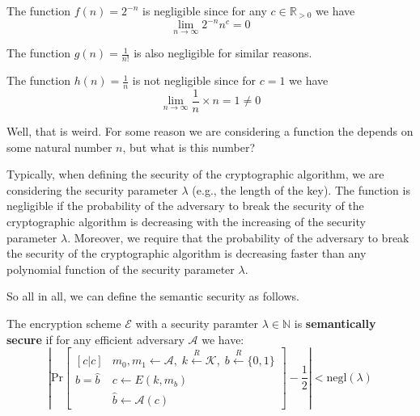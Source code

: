 \documentclass[../lecture-notes.tex]{subfiles}
\begin{document}
\begin{example}
    The function $f(n) = 2^{-n}$ is negligible since for any $c \in \mathbb{R}_{>0}$ we have
    \begin{equation}
        \lim_{n \to \infty} 2^{-n}n^c = 0
    \end{equation}

    The function $g(n) = \frac{1}{n!}$ is also negligible for similar reasons.
\end{example}

\begin{example}
    The function $h(n) = \frac{1}{n}$ is not negligible since for $c = 1$ we have
    \begin{equation}
        \lim_{n \to \infty} \frac{1}{n} \times n = 1 \neq 0
    \end{equation}
\end{example}

Well, that is weird. For some reason we are considering a function the depends on some natural number $n$, but what is this number?

Typically, when defining the security of the cryptographic algorithm, we are considering the security parameter $\lambda$ (e.g., the length of the key). The function is negligible if the probability of the adversary to break the security of the cryptographic algorithm is decreasing with the increasing of the security parameter $\lambda$. Moreover, we require that the probability of the adversary to break the security of the cryptographic algorithm is decreasing faster than any polynomial function of the security parameter $\lambda$.

So all in all, we can define the semantic security as follows.

\begin{definition}
    The encryption scheme $\mathcal{E}$ with a security paramter $\lambda \in \mathbb{N}$ is \textbf{semantically secure} if for any efficient adversary $\mathcal{A}$ we have:
    \begin{equation}
        \left|\text{Pr}\begin{bmatrix}[c|c]
            & m_0, m_1 \gets \mathcal{A}, \; k \xleftarrow{R} \mathcal{K}, \; b \xleftarrow{R} \{0,1\} \\
            b = \hat{b} & c \gets E(k,m_b) \\
            &\hat{b} \gets \mathcal{A}(c)
        \end{bmatrix} - \frac{1}{2}\right| < \text{negl}(\lambda)
    \end{equation}
\end{definition}
\end{document}
